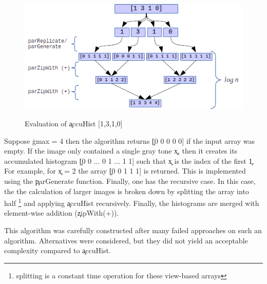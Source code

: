   \begin{figure}[h]
    \centering
    \includegraphics[width=\linewidth]{accuHist}
    \label{figure:accuHist}
    \caption{Evaluation of \c{accuHist [1,3,1,0]}}
  \end{figure}
  
  Suppose \c{gmax = 4} then the algorithm returns \c{[0 0 0 0 0]} if
  the input array was empty. If the image only contained a single gray tone
  \c{x}, then it creates its accumulated histogram
  \c{[0 0 ... 0 1 ... 1 1]} such that \c{x} is the index
  of the first \c{1}.
  For example, for \c{x = 2} the array
  \c{[0 0 1 1 1]} is returned. This is implemented using the \c{parGenerate} function.
  Finally, one has the recursive case. In this case, the the calculation
  of larger images is broken down by splitting the array into half
  \footnote{splitting is a constant time operation
  for these view-based arrays} and applying \c{accuHist}
  recursively. Finally, the histograms are merged with element-wise addition
  ({\c{zipWith(+)}}).
  
  This algorithm was carefully constructed after many failed approaches
  on such an algorithm. Alternatives were considered, but they did not
  yield an acceptable complexity compared to \c{accuHist}.

